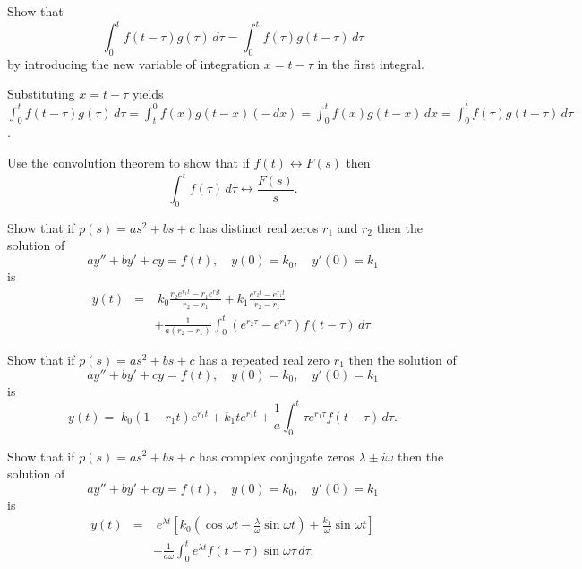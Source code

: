 \documentclass{ximera}
\begin{document}
\begin{problem}\label{exer:8.6.6}
 Show that
$$
\int_0^tf(t-\tau)g(\tau)\,d\tau=\int_0^tf(\tau)g(t-\tau)\,d\tau
$$
by introducing the new variable of integration $x=t-\tau$ in the first
integral.

\begin{solution}
Substituting $x=t-\tau$ yields
$\int_0^tf(t-\tau)g(\tau)\,d\tau=\int_t^0f(x)g(t-x)(-\,dx)=
\int_0^tf(x)g(t-x)\,dx=\int_0^tf(\tau)g(t-\tau)\,d\tau$.
\end{solution}
\end{problem}

\begin{problem}\label{exer:8.6.7} Use the convolution theorem to show that if
$f(t)\leftrightarrow F(s)$ then
$$
\int_0^tf(\tau)\,d\tau\leftrightarrow \frac{F(s)}{s}.
$$
\end{problem}

\begin{problem}\label{exer:8.6.8}
 Show that if $p(s)=as^2+bs+c$ has
distinct real zeros $r_1$ and $r_2$ then the solution of
$$
ay''+by'+cy=f(t),\quad y(0)=k_0,\quad y'(0)=k_1
$$
is
\begin{eqnarray*}
y(t)&=&\; k_0\frac{r_2e^{r_1t}-r_1e^{r_2t}}{r_2-r_1}+k_1\frac{e^{r_2t}-e^{r_1t}
}{r_2-r_1}
\\
&&+\frac{1}{a(r_2-r_1)}\int_0^t(e^{r_2\tau}-e^{r_1\tau})f(t-\tau)\,d\tau.
\end{eqnarray*}
\end{problem}

\begin{problem}\label{exer:8.6.9}
Show that if $p(s)=as^2+bs+c$ has
a repeated  real zero $r_1$ then
 the solution of
$$
ay''+by'+cy=f(t),\quad y(0)=k_0,\quad y'(0)=k_1
$$
is
$$
y(t)=\; k_0(1-r_1t)e^{r_1t}+k_1te^{r_1t}
+\frac{1}{a}\int_0^t\tau
e^{r_1\tau}f(t-\tau)\,d\tau.
$$
\end{problem}

\begin{problem}\label{exer:8.6.10}
 Show that if $p(s)=as^2+bs+c$ has
 complex conjugate zeros $\lambda\pm i\omega$
then the solution of
$$
ay''+by'+cy=f(t),\quad y(0)=k_0,\quad y'(0)=k_1
$$
is
\begin{eqnarray*}
y(t)&=&\;  e^{\lambda t}\left[k_0(\cos\omega t-\frac{\lambda}{\omega}\sin\omega
t)+\frac{k_1}{\omega}\sin\omega t\right]
\\
&&+\frac{1}{a\omega}\int_0^te^{\lambda t}f(t-\tau)\sin\omega\tau\,
d\tau.
\end{eqnarray*}
\end{problem}
\end{document}

